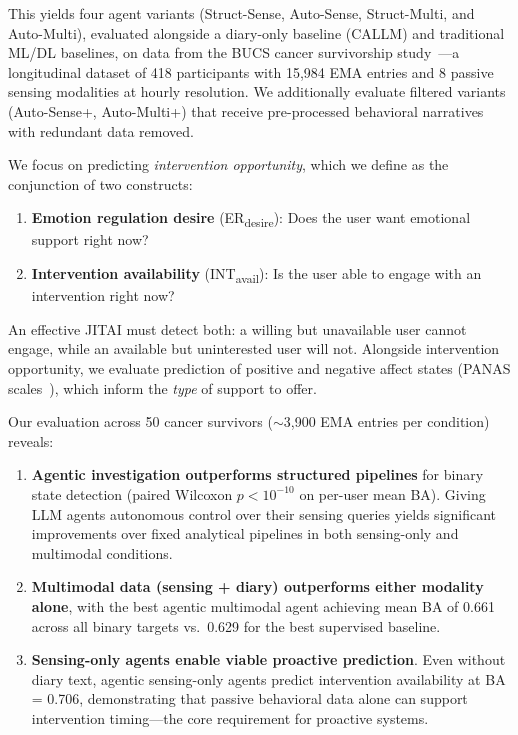 \documentclass[screen,review,anonymous]{acmart}
\newcommand{\erdesire}{ER\textsubscript{desire}}
\newcommand{\intavail}{INT\textsubscript{avail}}
\begin{document}
\noindent This yields four agent variants (Struct-Sense, Auto-Sense, Struct-Multi, and Auto-Multi), evaluated alongside a diary-only baseline (CALLM) and traditional ML/DL baselines, on data from the BUCS cancer survivorship study~\cite{wang2026callm}---a longitudinal dataset of 418 participants with 15,984 EMA entries and 8 passive sensing modalities at hourly resolution. We additionally evaluate filtered variants (Auto-Sense+, Auto-Multi+) that receive pre-processed behavioral narratives with redundant data removed.

We focus on predicting \emph{intervention opportunity}, which we define as the conjunction of two constructs:
\begin{enumerate}[nosep]
    \item \textbf{Emotion regulation desire} (\erdesire{}): Does the user want emotional support right now?
    \item \textbf{Intervention availability} (\intavail{}): Is the user able to engage with an intervention right now?
\end{enumerate}

\noindent An effective JITAI must detect both: a willing but unavailable user cannot engage, while an available but uninterested user will not. Alongside intervention opportunity, we evaluate prediction of positive and negative affect states (PANAS scales~\cite{watson1988panas}), which inform the \emph{type} of support to offer.

Our evaluation across 50 cancer survivors (${\sim}$3,900 EMA entries per condition) reveals:

\begin{enumerate}[nosep]
    \item \textbf{Agentic investigation outperforms structured pipelines} for binary state detection (paired Wilcoxon $p < 10^{-10}$ on per-user mean BA). Giving LLM agents autonomous control over their sensing queries yields significant improvements over fixed analytical pipelines in both sensing-only and multimodal conditions.

    \item \textbf{Multimodal data (sensing + diary) outperforms either modality alone}, with the best agentic multimodal agent achieving mean BA of 0.661 across all binary targets vs.\ 0.629 for the best supervised baseline.

    \item \textbf{Sensing-only agents enable viable proactive prediction}. Even without diary text, agentic sensing-only agents predict intervention availability at BA = 0.706, demonstrating that passive behavioral data alone can support intervention timing---the core requirement for proactive systems.
\end{enumerate}
\end{document}
